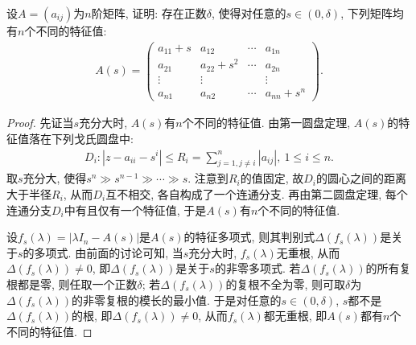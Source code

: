 \documentclass[../../main.tex]{subfiles}
\begin{document}
\begin{example}
设\(A = (a_{ij})\)为\(n\)阶矩阵, 证明: 存在正数\(\delta\), 使得对任意的\(s \in (0,\delta)\), 下列矩阵均有\(n\)个不同的特征值:
\begin{align*}
A(s)= 
\begin{pmatrix}
a_{11}+s & a_{12} & \cdots & a_{1n}\\
a_{21} & a_{22}+s^{2} & \cdots & a_{2n}\\
\vdots & \vdots & & \vdots\\
a_{n1} & a_{n2} & \cdots & a_{nn}+s^{n}
\end{pmatrix}.
\end{align*}
\end{example}
\begin{proof}
先证当\(s\)充分大时, \(A(s)\)有\(n\)个不同的特征值. 由第一圆盘定理, \(A(s)\)的特征值落在下列戈氏圆盘中:
\begin{align*}
D_{i}:|z - a_{ii}-s^{i}| \leq R_{i}=\sum_{j = 1,j\neq i}^{n}|a_{ij}|,\ 1 \leq i \leq n.
\end{align*}
取\(s\)充分大, 使得\(s^{n} \gg s^{n - 1} \gg \cdots \gg s\). 注意到\(R_{i}\)的值固定, 故\(D_{i}\)的圆心之间的距离大于半径\(R_{i}\), 从而\(D_{i}\)互不相交, 各自构成了一个连通分支. 再由第二圆盘定理, 每个连通分支\(D_{i}\)中有且仅有一个特征值, 于是\(A(s)\)有\(n\)个不同的特征值.

设\(f_{s}(\lambda)=|\lambda I_{n}-A(s)|\)是\(A(s)\)的特征多项式, 则其判别式\(\Delta(f_{s}(\lambda))\)是关于\(s\)的多项式. 由前面的讨论可知, 当\(s\)充分大时, \(f_{s}(\lambda)\)无重根, 从而\(\Delta(f_{s}(\lambda)) \neq 0\), 即\(\Delta(f_{s}(\lambda))\)是关于\(s\)的非零多项式. 若\(\Delta(f_{s}(\lambda))\)的所有复根都是零, 则任取一个正数\(\delta\); 若\(\Delta(f_{s}(\lambda))\)的复根不全为零, 则可取\(\delta\)为\(\Delta(f_{s}(\lambda))\)的非零复根的模长的最小值. 于是对任意的\(s \in (0,\delta)\), \(s\)都不是\(\Delta(f_{s}(\lambda))\)的根, 即\(\Delta(f_{s}(\lambda)) \neq 0\), 从而\(f_{s}(\lambda)\)都无重根, 即\(A(s)\)都有\(n\)个不同的特征值. 
\end{proof}
\end{document}
